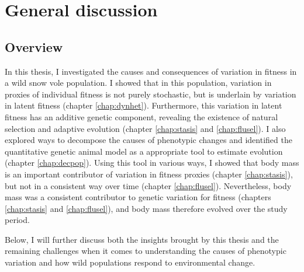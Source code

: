 
\chapter[\texorpdfstring{Chapter 6 \\ General discussion}{Chapter 6 General discussion}]{General discussion}
\label{chap:discu}

\section{Overview}
In this thesis, I investigated the causes and consequences of variation in fitness in a wild snow vole population. I showed that in this population, variation in proxies of individual fitness is not purely stochastic, but is underlain by variation in latent fitness (chapter \ref{chap:dynhet}). Furthermore, this variation in latent fitness has an additive genetic component, revealing the existence of natural selection and adaptive evolution (chapter \ref{chap:stasis} and \ref{chap:flusel}).
I also explored ways to decompose the causes of phenotypic changes and identified the quantitative genetic animal model as a appropriate tool to estimate evolution (chapter \ref{chap:decpop}).
Using this tool in various ways, I showed that body mass is an important contributor of variation in fitness proxies (chapter \ref{chap:stasis}), but not in a consistent way over time (chapter \ref{chap:flusel}). Nevertheless, body mass was a consistent contributor to genetic variation for fitness (chapters \ref{chap:stasis} and \ref{chap:flusel}), and body mass therefore evolved over the study period.

Below, I will further discuss both the insights brought by this thesis and the remaining challenges when it comes to understanding the causes of phenotypic variation and how wild populations respond to environmental change. 

